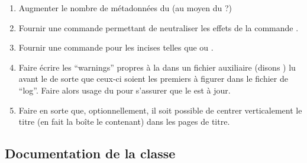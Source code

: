 \begin{enumerate}
\item Augmenter le nombre de métadonnées du  (au moyen du
   ?)
\item Fournir une commande  permettant de
  neutraliser les effets de la commande .
\item Fournir une commande  pour les incises telles que
   ou .
\item Faire écrire les \foreignquote{english}{warnings} propres à la \yatCl{}
  dans un fichier auxiliaire (disons ) lu avant le  de sorte que ceux-ci
  soient les premiers à figurer dans le fichier de
  \foreignquote{english}{log}. Faire alors usage du 
  pour s'assurer que le  est à jour.
\item Faire en sorte que, optionnellement, il soit possible de centrer
  verticalement le titre (en fait la boîte le contenant) dans les pages de
  titre.
\end{enumerate}

\subsection{Documentation de la classe}
\label{sec-documentation-de-la-ult}

